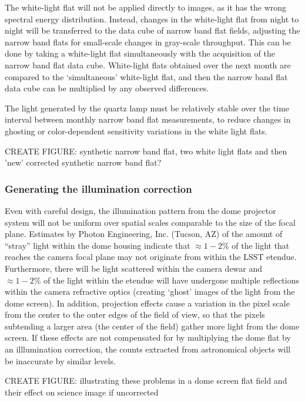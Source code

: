 \documentclass[12pt,preprint]{aastex}
\begin{document}
The white-light flat will not be applied directly to images, as it has
the wrong spectral energy distribution. Instead, changes in the
white-light flat from night to night will be transferred to the data
cube of narrow band flat fields, adjusting the narrow band flats for
small-scale changes in gray-scale throughput. This can be done by taking a
white-light flat simultaneously with the acquisition of the narrow
band flat data cube. White-light flats obtained over the next month
are compared to the `simultaneous' white-light flat, and then the
narrow band flat data cube can be multiplied by any observed differences.

The light generated by the quartz lamp must be relatively stable over
the time interval between monthly narrow band flat measurements, to
reduce changes in ghosting or color-dependent sensitivity variations
in the white light flats.

CREATE FIGURE: synthetic narrow band flat, two white light flats and then 'new'
corrected synthetic narrow band flat?

\subsubsection{Generating the illumination correction}

Even with careful design, the illumination pattern from the dome
projector system will not be uniform over spatial scales comparable to
the size of the focal plane. Estimates by Photon Engineering,
Inc. (Tucson, AZ) of the amount of ``stray'' light within the dome
housing indicate that $\approx 1−2\%$ of the light that reaches the
camera focal plane may not originate from within the LSST etendue.
Furthermore, there will be light scattered within the camera dewar and
$\approx 1-2\%$ of the light within the etendue will have undergone
multiple reflections within the camera refractive optics (creating
`ghost' images of the light from the dome screen). In addition,
projection effects cause a variation in the pixel scale from the
center to the outer edges of the field of view, so that the pixels
subtending a larger area (the center of the field) gather more light
from the dome screen. If these effects are not compensated for by
multiplying the dome flat by an illlumination correction, the counts
extracted from astronomical objects will be inaccurate by similar
levels.

CREATE FIGURE: illustrating these problems in a dome screen flat field
and their effect on science image if uncorrected
\end{document}
